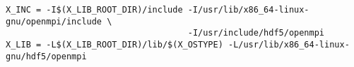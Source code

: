 \begin{verbatim}
X_INC = -I$(X_LIB_ROOT_DIR)/include -I/usr/lib/x86_64-linux-gnu/openmpi/include \
                                    -I/usr/include/hdf5/openmpi
X_LIB = -L$(X_LIB_ROOT_DIR)/lib/$(X_OSTYPE) -L/usr/lib/x86_64-linux-gnu/hdf5/openmpi
\end{verbatim}


